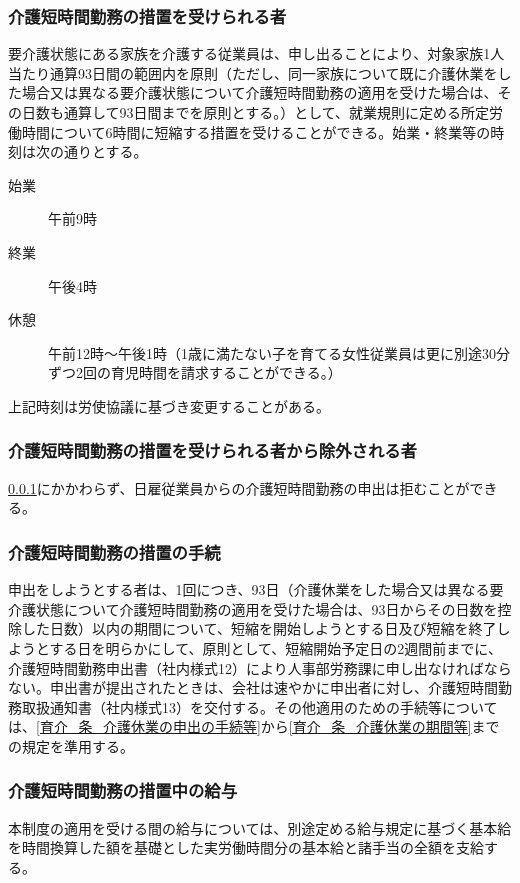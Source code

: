 \documentclass{jsarticle}
\begin{document}
\subsubsection{介護短時間勤務の措置を受けられる者}
\label{育介_項_介護短時間勤務の措置を受けられる者}
要介護状態にある家族を介護する従業員は、申し出ることにより、対象家族1人当たり通算93日間の範囲内を原則（ただし、同一家族について既に介護休業をした場合又は異なる要介護状態について介護短時間勤務の適用を受けた場合は、その日数も通算して93日間までを原則とする。）として、就業規則に定める所定労働時間について6時間に短縮する措置を受けることができる。始業・終業等の時刻は次の通りとする。
\begin{description}
  \item[始業]午前9時
  \item[終業]午後4時
  \item[休憩]午前12時〜午後1時（1歳に満たない子を育てる女性従業員は更に別途30分ずつ2回の育児時間を請求することができる。）
\end{description}
上記時刻は労使協議に基づき変更することがある。

\subsubsection{介護短時間勤務の措置を受けられる者から除外される者}
\label{育介_項_介護短時間勤務の措置を受けられる者から除外される者}
\ref{育介_項_介護短時間勤務の措置を受けられる者}にかかわらず、日雇従業員からの介護短時間勤務の申出は拒むことができる。

\subsubsection{介護短時間勤務の措置の手続}
\label{育介_項_介護短時間勤務の措置の手続}
申出をしようとする者は、1回につき、93日（介護休業をした場合又は異なる要介護状態について介護短時間勤務の適用を受けた場合は、93日からその日数を控除した日数）以内の期間について、短縮を開始しようとする日及び短縮を終了しようとする日を明らかにして、原則として、短縮開始予定日の2週間前までに、介護短時間勤務申出書（社内様式12）により人事部労務課に申し出なければならない。申出書が提出されたときは、会社は速やかに申出者に対し、介護短時間勤務取扱通知書（社内様式13）を交付する。その他適用のための手続等については、\ref{育介_条_介護休業の申出の手続等}から\ref{育介_条_介護休業の期間等}までの規定を準用する。

\subsubsection{介護短時間勤務の措置中の給与}
\label{育介_項_介護短時間勤務の措置中の給与}
本制度の適用を受ける間の給与については、別途定める給与規定に基づく基本給を時間換算した額を基礎とした実労働時間分の基本給と諸手当の全額を支給する。
\end{document}
